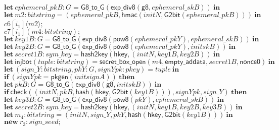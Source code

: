 \documentclass{article}
\newcommand{\cinput}[2]{{#1}({#2})}
\newcommand{\coutput}[2]{\overline{#1}\langle{#2}\rangle}
\newcommand{\kw}[1]{\mathbf{#1}}
\newcommand{\kwf}[1]{\mathsf{#1}}
\newcommand{\var}[1]{\mathit{#1}}
\newcommand{\kwt}[1]{\mathit{#1}}
\newcommand{\kwc}[1]{\mathit{#1}}
\begin{document}
\begin{tabbing}
\>$\quad \kw{let}\ \var{ephemeral{\_}pkB}: \kwt{G} = \kwf{G8{\_}to{\_}G}(\kwf{exp{\_}div8}(\kwf{g8}, \var{ephemeral{\_}skB}))\ \kw{in}$\\
\>$\quad \kw{let}\ \var{m2}: \kwt{bitstring} = \kwf{}(\var{ephemeral{\_}pkB}, \kwf{hmac}(\var{initN}, \kwf{G2bit}(\var{ephemeral{\_}pkB})))\ \kw{in}$\\
\>$\quad \coutput{\kwc{c6}[\var{i}_{1}]}{\var{m2}};$\\
\>$\quad \cinput{\kwc{c7}[\var{i}_{1}]}{\var{m4}: \kwt{bitstring}};$\\
\>$\quad \kw{let}\ \var{key1B}: \kwt{G} = \kwf{G8{\_}to{\_}G}(\kwf{exp{\_}div8}(\kwf{pow8}(\var{ephemeral{\_}pkY}), \var{ephemeral{\_}skB}))\ \kw{in}$\\
\>$\quad \kw{let}\ \var{key2B}: \kwt{G} = \kwf{G8{\_}to{\_}G}(\kwf{exp{\_}div8}(\kwf{pow8}(\var{ephemeral{\_}pkY}), \var{initskB}))\ \kw{in}$\\
\>$\quad \kw{let}\ \var{secret1B}: \kwt{sym{\_}key} = \kwf{hash2key}(\kwf{hkey}, \kwf{}(\var{initN}, \var{key1B}, \var{key2B}))\ \kw{in}$\\
\>$\quad \kw{let}\ \kwf{injbot}(\var{tuple}: \kwt{bitstring}) = \kwf{secret{\_}box{\_}open}(\var{m4}, \kwf{empty{\_}addata}, \var{secret1B}, \kwf{nonce0})\ \kw{in}$\\
\>$\quad \kw{let}\ \kwf{}(\var{sign{\_}Y}: \kwt{bitstring}, \var{pkY}: \kwt{G}, \var{signYpk}: \kwt{pkey}) = \var{tuple}\ \kw{in}$\\
\>$\quad \kw{if}\ (\var{signYpk}  =  \kwf{pkgen}(\var{initsignA}))\ \kw{then}$\\
\>$\quad \kw{let}\ \var{pkB}: \kwt{G} = \kwf{G8{\_}to{\_}G}(\kwf{exp{\_}div8}(\kwf{g8}, \var{initskB}))\ \kw{in}$\\
\>$\quad \kw{if}\ \kwf{check}(\kwf{}(\var{initN}, \var{pkB}, \kwf{hash}(\kwf{hkey}, \kwf{G2bit}(\var{key1B}))), \var{signYpk}, \var{sign{\_}Y})\ \kw{then}$\\
\>$\quad \kw{let}\ \var{key3B}: \kwt{G} = \kwf{G8{\_}to{\_}G}(\kwf{exp{\_}div8}(\kwf{pow8}(\var{pkY}), \var{ephemeral{\_}skB}))\ \kw{in}$\\
\>$\quad \kw{let}\ \var{secret2B}: \kwt{sym{\_}key} = \kwf{hash2key}(\kwf{hkey}, \kwf{}(\var{initN}, \var{key1B}, \var{key2B}, \var{key3B}))\ \kw{in}$\\
\>$\quad \kw{let}\ \var{m}_{4}: \kwt{bitstring} = \kwf{}(\var{initN}, \var{sign{\_}Y}, \var{pkY}, \kwf{hash}(\kwf{hkey}, \kwf{G2bit}(\var{key1B})))\ \kw{in}$\\
\>$\quad \kw{new}\ \var{r}_{3}: \kwt{sign{\_}seed};$\\

\end{tabbing}
\end{document}
